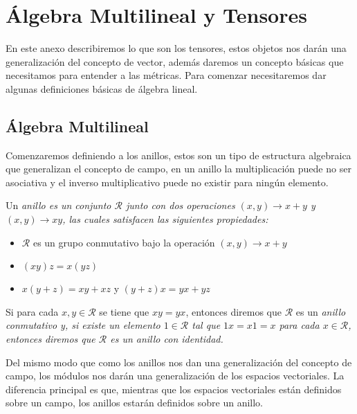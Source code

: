 \chapter{Álgebra Multilineal y Tensores}\label{Sección: Álgebra Multilineal y Tensores}

En este anexo describiremos lo que son los tensores, estos objetos nos darán una generalización del concepto de vector, además daremos un concepto básicas que necesitamos para entender a las métricas. Para comenzar necesitaremos dar algunas definiciones básicas de álgebra lineal.

\section{Álgebra Multilineal}
Comenzaremos definiendo a los anillos, estos son un tipo de estructura algebraica que generalizan el concepto de campo, en un anillo la multiplicación puede no ser asociativa y el inverso multiplicativo puede no existir para ningún elemento.

\begin{definition}[Anillo]
	Un \it{anillo} es un conjunto $\mathcal{R}$ junto con dos operaciones $(x,y) \to x + y$ y $(x,y) \to xy$, las cuales satisfacen las siguientes propiedades:
	\begin{itemize}
		\item $\mathcal{R}$ es un grupo conmutativo bajo la operación $(x,y) \to x + y$
		\item $(xy)z = x(yz)$
		\item $x(y + z) = xy + xz$ y $(y+z)x = yx + yz$
	\end{itemize}

	Si para cada $x,y \in \mathcal{R}$ se tiene que $xy = yx$, entonces diremos que $\mathcal{R}$ es un \it{anillo conmutativo} y, si existe un elemento $1 \in \mathcal{R}$ tal que $1x = x1 = x$ para cada $x \in \mathcal{R}$, entonces diremos que $\mathcal{R}$ es un \it{anillo con identidad}.
\end{definition}

Del mismo modo que como los anillos nos dan una generalización del concepto de campo, los módulos nos darán una generalización de los espacios vectoriales. La diferencia principal es que, mientras que los espacios vectoriales están definidos sobre un campo, los anillos estarán definidos sobre un anillo.

